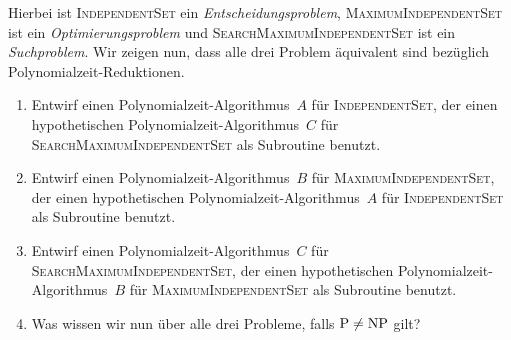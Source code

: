 \documentclass{uebung_cs}
\begin{document}
\begin{exercise}
	Hierbei ist \textsc{IndependentSet} ein \emph{Entscheidungsproblem}, \textsc{MaximumIndependentSet} ist ein \emph{Optimierungsproblem} und \textsc{SearchMaximumIndependentSet} ist ein \emph{Suchproblem}.
	Wir zeigen nun, dass alle drei Problem äquivalent sind bezüglich Polynomialzeit-Reduktionen.
	\begin{enumerate}
		\item\easy
		Entwirf einen Polynomialzeit-Algorithmus~$A$ für \textsc{IndependentSet}, der einen hypothetischen Polynomialzeit-Algorithmus~$C$ für \textsc{SearchMaximumIndependentSet} als Subroutine benutzt.
		\item\medium 
		Entwirf einen Polynomialzeit-Algorithmus~$B$ für \textsc{MaximumIndependentSet}, der einen hypothetischen Polynomialzeit-Algorithmus~$A$ für \textsc{IndependentSet} als Subroutine benutzt.
		\item\hard
		Entwirf einen Polynomialzeit-Algorithmus~$C$ für \textsc{SearchMaximumIndependentSet}, der einen hypothetischen Polynomialzeit-Algorithmus~$B$ für \textsc{MaximumIndependentSet} als Subroutine benutzt.
		\item\medium
		Was wissen wir nun über alle drei Probleme, falls $\mathrm{P}\ne \mathrm{NP}$ gilt?
	\end{enumerate}

\end{exercise}
\end{document}
